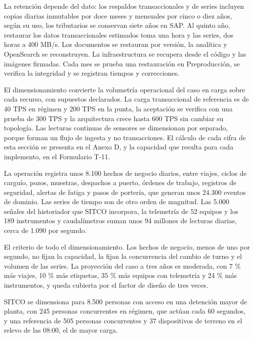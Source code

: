\documentclass[subdoc]{../../comun/overfore}
\begin{document}
La retención depende del dato: los respaldos transaccionales y de series incluyen copias diarias inmutables por doce meses y mensuales por cinco o diez años, según su uso, los tributarios se conservan siete años en SAP. Al quinto año, restaurar los datos transaccionales estimados toma una hora y las series, dos horas a 400 MB/s. Los documentos se restauran por versión, la analítica y OpenSearch se reconstruyen. La infraestructura se recupera desde el código y las imágenes firmadas. Cada mes se prueba una restauración en Preproducción, se verifica la integridad y se registran tiempos y correcciones.

El dimensionamiento convierte la volumetría operacional del caso en carga sobre cada recurso, con supuestos declarados. La carga transaccional de referencia es de 40 TPS en régimen y 200 TPS en la punta, la aceptación se verifica con una prueba de 300 TPS y la arquitectura crece hasta 600 TPS sin cambiar su topología. Las lecturas continuas de sensores se dimensionan por separado, porque forman un flujo de ingesta y no transacciones. El cálculo de cada cifra de esta sección se presenta en el Anexo D, y la capacidad que resulta para cada implemento, en el Formulario T-11.

La operación registra unos 8.100 hechos de negocio diarios, entre viajes, ciclos de carguío, pozos, muestras, despachos a puerto, órdenes de trabajo, registros de seguridad, alertas de fatiga y pasos de portería, que generan unos 24.300 eventos de dominio. Las series de tiempo son de otro orden de magnitud. Las 5.000 señales del historiador que SITCO incorpora, la telemetría de 52 equipos y los 189 instrumentos y caudalímetros suman unos 94 millones de lecturas diarias, cerca de 1.090 por segundo.

El criterio de todo el dimensionamiento. Los hechos de negocio, menos de uno por segundo, no fijan la capacidad, la fijan la concurrencia del cambio de turno y el volumen de las series. La proyección del caso a tres años es moderada, con 7 \% más viajes, 10 \% más etiquetas, 35 \% más equipos con telemetría y 24 \% más instrumentos, y queda cubierta por el factor de diseño de tres veces.

SITCO se dimensiona para 8.500 personas con acceso en una detención mayor de planta, con 245 personas concurrentes en régimen, que actúan cada 60 segundos, y una referencia de 505 personas concurrentes y 37 dispositivos de terreno en el relevo de las 08:00, el de mayor carga.
\end{document}
